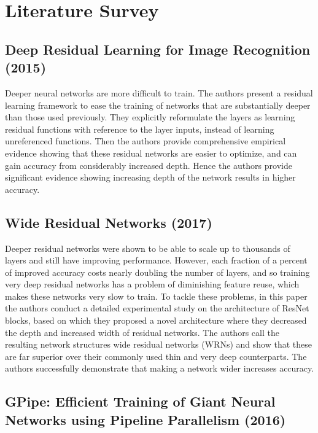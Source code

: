 \chapter{Literature Survey}
\section{Deep Residual Learning for Image Recognition (2015)}

Deeper neural networks are more difficult to train. The authors present a residual learning framework to ease the training of networks that are substantially deeper than those used previously. They explicitly reformulate the layers as learning residual functions with reference to the layer inputs, instead of learning unreferenced functions. Then the authors provide comprehensive empirical evidence showing that these residual networks are easier to optimize, and can gain accuracy from considerably increased depth. Hence the authors provide significant evidence showing increasing depth of the network results in higher accuracy.


\section{Wide Residual Networks (2017)}

Deeper residual networks were shown to be able to scale up to thousands of layers and still have improving performance. However, each fraction of a percent of improved accuracy costs nearly doubling the number of layers, and so training very deep residual networks has a problem of diminishing feature reuse, which makes these networks very slow to train. To tackle these problems, in this paper the authors conduct a detailed experimental study on the architecture of ResNet blocks, based on which they proposed a novel architecture where they decreased the depth and increased width of residual networks. The authors call the resulting network structures wide residual networks (WRNs) and show that these are far superior over their commonly used thin and very deep counterparts. The authors successfully demonstrate that making a network wider increases accuracy.


\section{GPipe: Efficient Training of Giant Neural Networks using Pipeline Parallelism (2016)}

